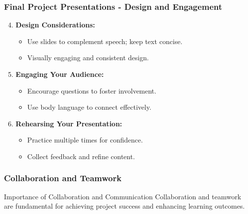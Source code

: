 \documentclass[aspectratio=169]{beamer}
\begin{document}
\begin{frame}[fragile]
    \frametitle{Final Project Presentations - Design and Engagement}
    \begin{enumerate}
        \setcounter{enumi}{3}
        \item \textbf{Design Considerations:}
            \begin{itemize}
                \item Use slides to complement speech; keep text concise.
                \item Visually engaging and consistent design.
            \end{itemize}

        \item \textbf{Engaging Your Audience:}
            \begin{itemize}
                \item Encourage questions to foster involvement.
                \item Use body language to connect effectively.
            \end{itemize}

        \item \textbf{Rehearsing Your Presentation:}
            \begin{itemize}
                \item Practice multiple times for confidence.
                \item Collect feedback and refine content.
            \end{itemize}
    \end{enumerate}
\end{frame}

\begin{frame}[fragile]
    \frametitle{Collaboration and Teamwork}
    \begin{block}{Importance of Collaboration and Communication}
        Collaboration and teamwork are fundamental for achieving project success and enhancing learning outcomes.
    \end{block}
\end{frame}
\end{document}

